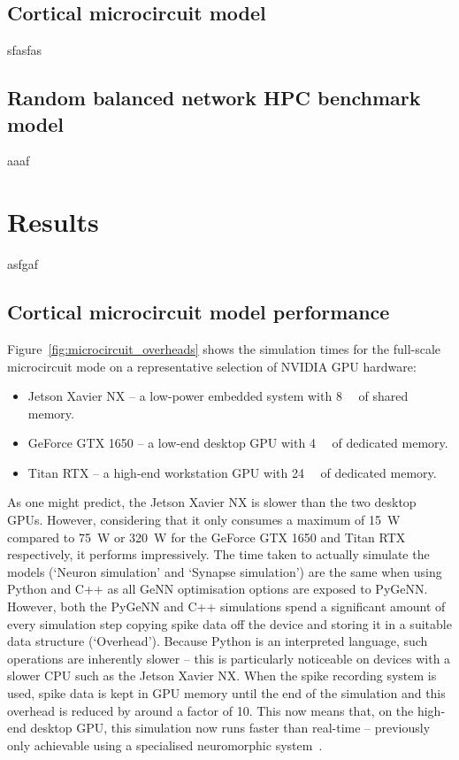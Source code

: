 \documentclass[utf8]{frontiersSCNS} %
\begin{document}
\subsection{Cortical microcircuit model}
sfasfas

\subsection{Random balanced network HPC benchmark model}
aaaf

\section{Results}
asfgaf

\subsection{Cortical microcircuit model performance}
Figure~\ref{fig:microcircuit_overheads} shows the simulation times for the full-scale microcircuit mode on a representative selection of NVIDIA GPU hardware:
%
\begin{itemize}
    \item Jetson Xavier NX -- a low-power embedded system with \SI{8}{\giga\byte} of shared memory.
    \item GeForce GTX 1650 -- a low-end desktop GPU with \SI{4}{\giga\byte} of dedicated memory.
    \item Titan RTX -- a high-end workstation GPU with \SI{24}{\giga\byte} of dedicated memory.
\end{itemize}
%
As one might predict, the Jetson Xavier NX is slower than the two desktop GPUs.
However, considering that it only consumes a maximum of \SI{15}{\watt} compared to \SI{75}{\watt} or \SI{320}{\watt} for the GeForce GTX 1650 and Titan RTX respectively, it performs impressively.
The time taken to actually simulate the models (`Neuron simulation' and `Synapse simulation') are the same when using Python and C++ as all GeNN optimisation options are exposed to PyGeNN.
However, both the PyGeNN and C++ simulations spend a significant amount of every simulation step copying spike data off the device and storing it in a suitable data structure (`Overhead').
Because Python is an interpreted language, such operations are inherently slower -- this is particularly noticeable on devices with a slower CPU such as the Jetson Xavier NX.
When the spike recording system is used, spike data is kept in GPU memory until the end of the simulation and this overhead is reduced by around a factor of 10.
This now means that, on the high-end desktop GPU, this simulation now runs faster than real-time -- previously only achievable using a specialised neuromorphic system~\citep{Rhodes2019}.
\end{document}
